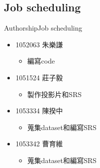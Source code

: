 \documentclass{beamer}
\begin{document}
\begin{CJK*}{UTF8}{bsmi}
\subsection*{Job scheduling}
\begin{frame}{Authorship}{Job scheduling}
  \begin{itemize}
  \item {
    1052063 朱樂謙
  }
   \begin{itemize}
   \item 編寫code\\[0.5cm]
   \end{itemize}
  \item {
    1051524 莊子毅
  }
   \begin{itemize}
   \item 製作投影片和SRS\\[0.5cm]
   \end{itemize}
  \item {
    1053334 陳揆中
  }
   \begin{itemize}
   \item 蒐集dataset和編寫SRS\\[0.5cm]
   \end{itemize}
  \item {
    1053342 曹育維
  }
   \begin{itemize}
   \item 蒐集dataset和編寫SRS\\[0.5cm]
   \end{itemize}
  \end{itemize}
\end{frame}





\end{CJK*}
\end{document}
